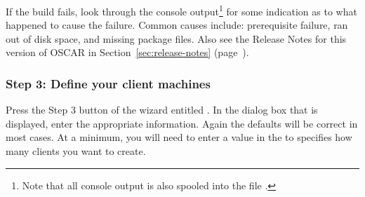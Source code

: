 If the build fails, look through the console output\footnote{Note that
  all console output is also spooled into the file
  .} for some indication as to what happened to
cause the failure.  Common causes include: prerequisite failure, ran
out of disk space, and missing package files.  Also see the Release
Notes for this version of OSCAR in Section~\ref{sec:release-notes}
(page~\pageref{sec:release-notes}).



\subsubsection{Step 3: Define your client machines} 
\label{det:defclients}

Press the Step 3 button of the wizard entitled . In the dialog box that is displayed, enter the appropriate
information. Again the defaults will be correct in most cases. At a
minimum, you will need to enter a value in the 
to specifies how many clients you want to create.

